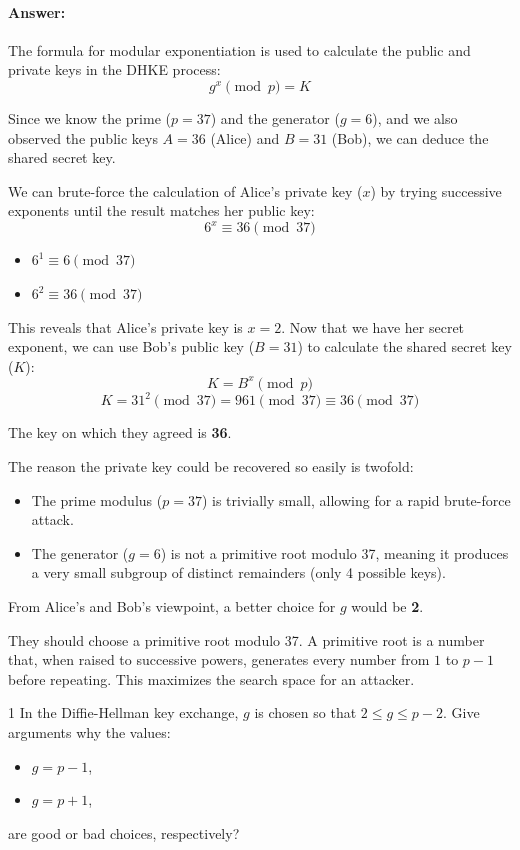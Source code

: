 \documentclass[]{scrartcl}
\newcounter{exercise}
\newcounter{qid}[section]
\newcommand{\exerciseprefix}{prefix}
\newcommand{\questiontitle}{Questions}
\newcommand{\blockid}{B4}
\newcommand{\exname}{}
\begin{document}
\paragraph{Answer:}

The formula for modular exponentiation is used to calculate the public and private keys in the DHKE process:
$$g^x \pmod{p} = K$$

Since we know the prime ($p = 37$) and the generator ($g = 6$), and we also observed the public keys $A = 36$ (Alice) and $B = 31$ (Bob), we can deduce the shared secret key. 

We can brute-force the calculation of Alice's private key ($x$) by trying successive exponents until the result matches her public key:
$$6^x \equiv 36 \pmod{37}$$

\begin{itemize}
    \item $6^1 \equiv 6 \pmod{37}$
    \item $6^2 \equiv 36 \pmod{37}$
\end{itemize}

This reveals that Alice's private key is $x = 2$. Now that we have her secret exponent, we can use Bob's public key ($B = 31$) to calculate the shared secret key ($K$):
$$K = B^x \pmod{p}$$
$$K = 31^2 \pmod{37} = 961 \pmod{37} \equiv 36 \pmod{37}$$

The key on which they agreed is \textbf{36}.

The reason the private key could be recovered so easily is twofold:
\begin{itemize}
    \item The prime modulus ($p = 37$) is trivially small, allowing for a rapid brute-force attack.
    \item The generator ($g = 6$) is not a primitive root modulo 37, meaning it produces a very small subgroup of distinct remainders (only 4 possible keys).
\end{itemize}

From Alice's and Bob's viewpoint, a better choice for $g$ would be \textbf{2}. 

They should choose a primitive root modulo 37. A primitive root is a number that, when raised to successive powers, generates every number from $1$ to $p-1$ before repeating. This maximizes the search space for an attacker.
\renewcommand{\exerciseprefix}{PS-\blockid{}-E\theexercise: \exname{}-Q\theqid}
\renewcommand{\questiontitle}{\exerciseprefix{}: Practical computing with DHKE}
\begin{exercisebox}{1}
In the Diffie-Hellman key exchange, $g$ is chosen so that $2 \le g \le p - 2$. Give arguments why the values:
\begin{itemize}
    \item $g = p - 1$, 
    \item $g = p + 1$, 
\end{itemize}
are good or bad choices, respectively?
\end{exercisebox}
\end{document}

